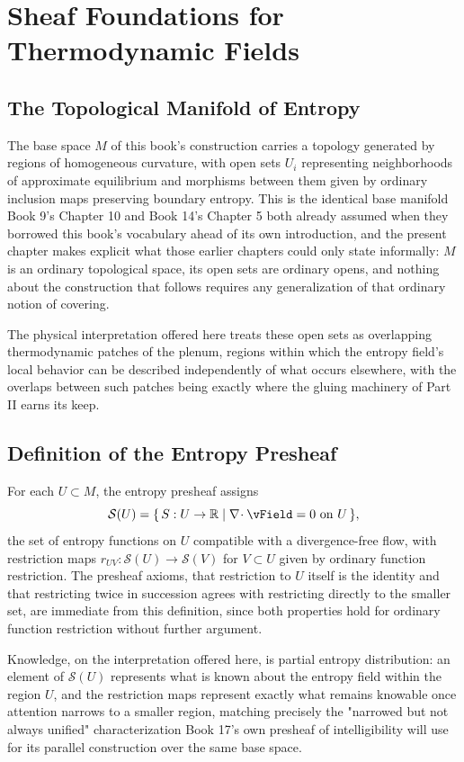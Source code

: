 \part{Sheaf Foundations for Thermodynamic Fields}

\chapter{The Topological Manifold of Entropy}

The base space $M$ of this book's construction carries a topology generated by regions of homogeneous curvature, with open sets $U_i$ representing neighborhoods of approximate equilibrium and morphisms between them given by ordinary inclusion maps preserving boundary entropy. This is the identical base manifold Book 9's Chapter 10 and Book 14's Chapter 5 both already assumed when they borrowed this book's vocabulary ahead of its own introduction, and the present chapter makes explicit what those earlier chapters could only state informally: $M$ is an ordinary topological space, its open sets are ordinary opens, and nothing about the construction that follows requires any generalization of that ordinary notion of covering.

The physical interpretation offered here treats these open sets as overlapping thermodynamic patches of the plenum, regions within which the entropy field's local behavior can be described independently of what occurs elsewhere, with the overlaps between such patches being exactly where the gluing machinery of Part II earns its keep.

\chapter{Definition of the Entropy Presheaf}

For each $U \subset M$, the entropy presheaf assigns
\[
\mathcal{S}(U) = \{\, \SEntropy: U \to \mathbb{R} \mid \diverg \vField = 0 \text{ on } U \,\},
\]
the set of entropy functions on $U$ compatible with a divergence-free flow, with restriction maps $r_{UV}: \mathcal{S}(U) \to \mathcal{S}(V)$ for $V \subset U$ given by ordinary function restriction. The presheaf axioms, that restriction to $U$ itself is the identity and that restricting twice in succession agrees with restricting directly to the smaller set, are immediate from this definition, since both properties hold for ordinary function restriction without further argument.

Knowledge, on the interpretation offered here, is partial entropy distribution: an element of $\mathcal{S}(U)$ represents what is known about the entropy field within the region $U$, and the restriction maps represent exactly what remains knowable once attention narrows to a smaller region, matching precisely the "narrowed but not always unified" characterization Book 17's own presheaf of intelligibility will use for its parallel construction over the same base space.

